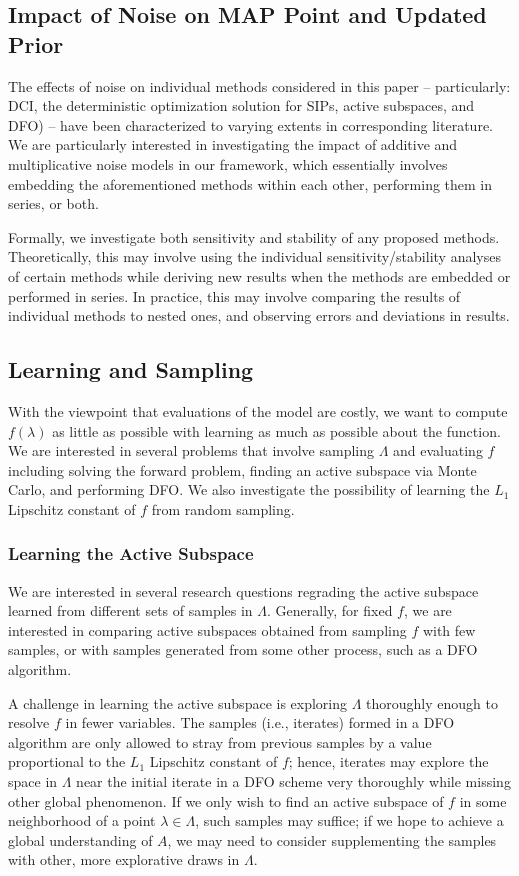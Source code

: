 \documentclass{amsart}
\begin{document}
\subsection{Impact of Noise on MAP Point and Updated Prior} The effects of noise on individual methods considered in this paper -- particularly: DCI, the deterministic optimization solution for SIPs, active subspaces, and DFO) -- have been characterized to varying extents in corresponding literature. We are particularly interested in investigating the impact of additive and multiplicative noise models in our framework, which essentially involves embedding the aforementioned methods within each other, performing them in series, or both.

Formally, we investigate both sensitivity and stability of any proposed methods. Theoretically, this may involve using the individual sensitivity/stability analyses of certain methods while deriving new results when the methods are embedded or performed in series. In practice, this may involve comparing the results of individual methods to nested ones, and observing errors and deviations in results.

\subsection{Learning and Sampling} With the viewpoint that evaluations of the model are costly, we want to compute $f(\lambda)$ as little as possible with learning as much as possible about the function. We are interested in several problems that involve sampling $\Lambda$ and evaluating $f$ including solving the forward problem, finding an active subspace via Monte Carlo, and performing DFO. We also investigate the possibility of learning the $L_1$ Lipschitz constant of $f$ from random sampling.

\subsubsection{Learning the Active Subspace} We are interested in several research questions regrading the active subspace learned from different sets of samples in $\Lambda$. Generally, for fixed $f$, we are interested in comparing active subspaces obtained from sampling $f$ with few samples, or with samples generated from some other process, such as a DFO algorithm.

A challenge in learning the active subspace is exploring $\Lambda$ thoroughly enough to resolve $f$ in fewer variables. The samples (i.e., iterates) formed in a DFO algorithm are only allowed to stray from previous samples by a value proportional to the $L_1$ Lipschitz constant of $f$; hence, iterates may explore the space in $\Lambda$ near the initial iterate in a DFO scheme very thoroughly while missing other global phenomenon. If we only wish to find an active subspace of $f$ in some neighborhood of a point $\lambda \in \Lambda$, such samples may suffice; if we hope to achieve a global understanding of $A$, we may need to consider supplementing the samples with other, more explorative draws in $\Lambda$.
\end{document}
